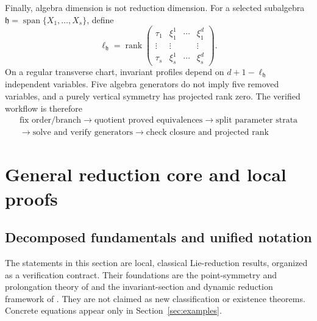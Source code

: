 \documentclass[11pt]{article}
\theoremstyle{definition}
\begin{document}
Finally, algebra dimension is not reduction dimension. For a selected
subalgebra $\mathfrak h=\operatorname{span}\{X_1,\ldots,X_s\}$, define
\begin{equation}
 \ell_{\mathfrak h}
 =\operatorname{rank}
 \begin{pmatrix}
  \tau_1&\xi_1^1&\cdots&\xi_1^d\\
  \vdots&\vdots&&\vdots\\
  \tau_s&\xi_s^1&\cdots&\xi_s^d
 \end{pmatrix}.
 \label{eq:parameter-projected-rank}
\end{equation}
On a regular transverse chart, invariant profiles depend on
$d+1-\ell_{\mathfrak h}$ independent variables. Five algebra generators do
not imply five removed variables, and a purely vertical symmetry has projected
rank zero. The verified workflow is therefore
\begin{equation}
 \boxed{\begin{gathered}
 \text{fix order/branch}
 \to\text{quotient proved equivalences}
 \to\text{split parameter strata}\\
 \to\text{solve and verify generators}
 \to\text{check closure and projected rank}
 \end{gathered}}
 \label{eq:parameter-workflow}
\end{equation}

\clearpage
\section{General reduction core and local proofs}
\label{sec:general-core}
\subsection{Decomposed fundamentals and unified notation}
\label{sec:decomposed-fundamentals}
The statements in this section are local, classical Lie-reduction results,
organized as a verification contract. Their foundations are the point-symmetry
and prolongation theory of \citet{olver} and the invariant-section and dynamic
reduction framework of \citet{anderson2000}. They are not claimed as new
classification or existence theorems. Concrete equations appear only in
Section~\ref{sec:examples}.
\end{document}

